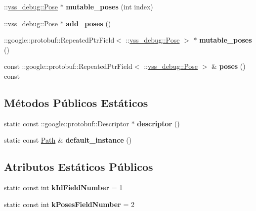 \begin{DoxyCompactItemize}
\item 
\+::\hyperlink{classvss__debug_1_1Pose}{vss\+\_\+debug\+::\+Pose} $\ast$ {\bfseries mutable\+\_\+poses} (int index)\hypertarget{classvss__debug_1_1Path_afcdcdbb2f516a6df6a871188ace9c415}{}\label{classvss__debug_1_1Path_afcdcdbb2f516a6df6a871188ace9c415}

\item 
\+::\hyperlink{classvss__debug_1_1Pose}{vss\+\_\+debug\+::\+Pose} $\ast$ {\bfseries add\+\_\+poses} ()\hypertarget{classvss__debug_1_1Path_aff82a92efa1b0968646598d6e2cb8a65}{}\label{classvss__debug_1_1Path_aff82a92efa1b0968646598d6e2cb8a65}

\item 
\+::google\+::protobuf\+::\+Repeated\+Ptr\+Field$<$ \+::\hyperlink{classvss__debug_1_1Pose}{vss\+\_\+debug\+::\+Pose} $>$ $\ast$ {\bfseries mutable\+\_\+poses} ()\hypertarget{classvss__debug_1_1Path_a2eb794be693f8207c6b3a08518effadd}{}\label{classvss__debug_1_1Path_a2eb794be693f8207c6b3a08518effadd}

\item 
const \+::google\+::protobuf\+::\+Repeated\+Ptr\+Field$<$ \+::\hyperlink{classvss__debug_1_1Pose}{vss\+\_\+debug\+::\+Pose} $>$ \& {\bfseries poses} () const \hypertarget{classvss__debug_1_1Path_a95c485b8485ddecfbdce3b3eaae88dd9}{}\label{classvss__debug_1_1Path_a95c485b8485ddecfbdce3b3eaae88dd9}

\end{DoxyCompactItemize}
\subsection*{Métodos Públicos Estáticos}
\begin{DoxyCompactItemize}
\item 
static const \+::google\+::protobuf\+::\+Descriptor $\ast$ {\bfseries descriptor} ()\hypertarget{classvss__debug_1_1Path_a8fcf1859c3c1c2250a4441a610f9abfb}{}\label{classvss__debug_1_1Path_a8fcf1859c3c1c2250a4441a610f9abfb}

\item 
static const \hyperlink{classvss__debug_1_1Path}{Path} \& {\bfseries default\+\_\+instance} ()\hypertarget{classvss__debug_1_1Path_a26996643d57311ecbe21fb145a9330fd}{}\label{classvss__debug_1_1Path_a26996643d57311ecbe21fb145a9330fd}

\end{DoxyCompactItemize}
\subsection*{Atributos Estáticos Públicos}
\begin{DoxyCompactItemize}
\item 
static const int {\bfseries k\+Id\+Field\+Number} = 1\hypertarget{classvss__debug_1_1Path_ab0c6d9a80fc2d5bac3bd83b3990b9f09}{}\label{classvss__debug_1_1Path_ab0c6d9a80fc2d5bac3bd83b3990b9f09}

\item 
static const int {\bfseries k\+Poses\+Field\+Number} = 2\hypertarget{classvss__debug_1_1Path_a4fc4f61c1caed01062dc10dfd2202380}{}\label{classvss__debug_1_1Path_a4fc4f61c1caed01062dc10dfd2202380}

\end{DoxyCompactItemize}
